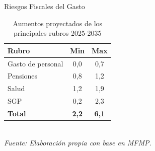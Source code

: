 \begin{frame}{Riesgos Fiscales del Gasto}
\small
\begin{table}
\centering
\caption{Aumentos proyectados de los principales rubros 2025-2035}
\begin{tabular}{lcc}
\hline
\textbf{Rubro} & \textbf{Min} & \textbf{Max} \\
\hline
Gasto de personal & 0,0 & 0,7 \\
Pensiones         & 0,8 & 1,2 \\
Salud             & 1,2 & 1,9 \\
SGP               & 0,2 & 2,3 \\
\hline
\textbf{Total}    & \textbf{2,2} & \textbf{6,1} \\
\hline
\end{tabular}
\\ \vspace{0.4cm}
\footnotesize{\textit{Fuente: Elaboración propia con base en MFMP.}}
\end{table}
\end{frame}
